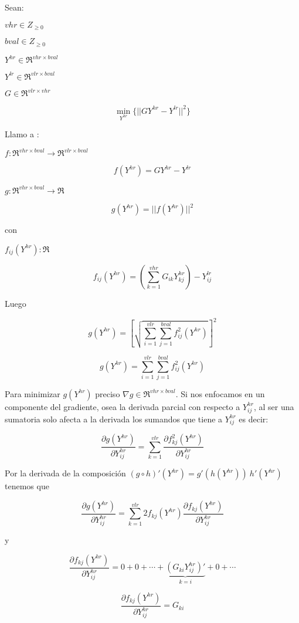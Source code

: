 

Sean:

 $ vhr \in  Z_{ \geq 0} $
 
 $ bval \in  Z_{ \geq 0} $
 
 $Y^{hr} \in \Re^{vhr\times bval}$
 
 $Y^{lr} \in \Re^{vlr\times bval}$

 $G \in \Re^{vlr\times vhr}$


$$  \min_{Y^{hr}} \{ || G Y^{hr} - Y^{lr} ||^2  \}$$

Llamo a :

$f : \Re^{vhr\times bval} \rightarrow \Re^{vlr\times bval}$

$$f(Y^{hr}) = G Y^{hr} - Y^{lr} $$

$g:\Re^{vhr\times bval} \rightarrow \Re$

$$g(Y^{hr}) = ||f(Y^{hr})||^2 $$

con 

$f_{ij}(Y^{hr}) : \Re$

$$f_{ij}(Y^{hr}) = (\sum_{k=1}^{vhr} G_{ik} Y_{kj}^{hr}) - Y_{ij}^{lr} $$

Luego

$$g(Y^{hr}) = [ \sqrt{ \sum_{i=1}^{vlr} \sum_{j=1}^{bval} f_{ij}^2 (Y^{hr})} ]^2 $$


$$g(Y^{hr}) =  \sum_{i=1}^{vlr} \sum_{j=1}^{bval} f_{ij}^2 (Y^{hr}) $$


Para minimizar $g(Y^{hr})$ preciso $\nabla g \in \Re^{vhr\times bval} $.
Si nos enfocamos en un componente del gradiente, osea la derivada parcial con respecto a 
$Y_{ij}^{hr}$, al ser una sumatoria solo afecta a la derivada los sumandos que tiene a 
$Y_{ij}^{hr}$ es decir:

$$\frac{\partial g (Y^{hr})}{\partial Y_{ij}^{hr}} = \sum_{k=1}^{vlr} \frac{\partial 
f_{kj}^2(Y^{hr})}{\partial Y_{ij}^{hr}}$$



Por la derivada de la composición $(g \circ h)' (Y^{hr}) = g'(h(Y^{hr})) \ 
h'(Y^{hr})$ tenemos que 

$$\frac{\partial g (Y^{hr})}{\partial Y_{ij}^{hr}} = \sum_{k=1}^{vlr} 2 f_{kj}(Y^{hr}) 
\frac{\partial 
f_{kj}(Y^{hr})}{\partial Y_{ij}^{hr}}$$

y 


$$\frac{\partial f_{kj}(Y^{hr})}{\partial Y_{ij}^{hr}} = 0 + 0 + \cdots + 
\underbrace{(G_{ki}Y_{ij}^{hr})'}_{k=i} + 0 + \cdots $$

$$\frac{\partial f_{kj}(Y^{hr})}{\partial Y_{ij}^{hr}} = G_{ki}$$

